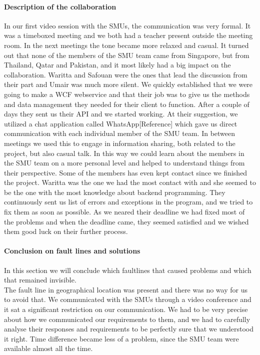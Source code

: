 \documentclass[a4paper,11pt,report]{article}
\begin{document}
{\paragraph{Description of the collaboration }
In our first video session with the SMUs, the communication was very formal. It was a timeboxed meeting and we both had a teacher present outside the meeting room. In the next meetings the tone became more relaxed and casual. It turned out that none of the members of the SMU team came from Singapore, but from Thailand, Qatar and Pakistan, and it most likely had a big impact on the collaboration. Waritta and Safouan were the ones that lead the discussion from their part and Umair was much more silent. We quickly established that we were going to make a WCF webservice and that their job was to give us the methods and data management they needed for their client to function. After a couple of days they sent us their API and we started working. At their suggestion, we utilized a chat application called WhatsApp[Reference] which gave us direct communication with each individual member of the SMU team. In between meetings we used this to engage in information sharing, both related to the project, but also casual talk. In this way we could learn about the members in the SMU team on a more personal level and helped to understand things from their perspective. Some of the members has even kept contact since we finished the project. Waritta was the one we had the most contact with and she seemed to be the one with the most knowledge about backend programming. They continuously sent us list of errors and exceptions in the program, and we tried to fix them as soon as possible. As we neared their deadline we had fixed most of the problems and when the deadline came, they seemed satisfied and we wished them good luck on their further process. \\

\paragraph{Conclusion on fault lines and solutions}
In this section we will conclude which faultlines that caused problems and which that remained invisible. \\

The fault line in geographical location was present and there was no way for us to avoid that. We communicated with the SMUs through a video conference and it sat a significant restriction on our communication. We had to be very precise about how we communicated our requirements to them, and we had to carefully analyse their responses and requirements to be perfectly sure that we understood it right. Time difference became less of a problem, since the SMU team were available almost all the time. \\

}
\end{document}
